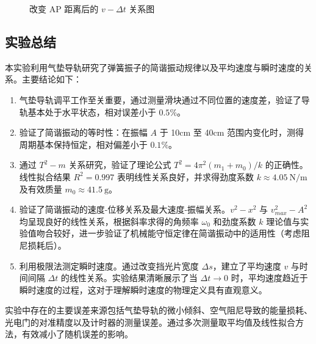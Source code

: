 \documentclass[11pt]{article}
\begin{document}
\begin{figure}[H]
    \centering
    \caption{改变 AP 距离后的 $v-\Delta t$ 关系图}
\end{figure}

\subsection{实验总结}
本实验利用气垫导轨研究了弹簧振子的简谐振动规律以及平均速度与瞬时速度的关系。主要结论如下：
\begin{enumerate}
    \item 气垫导轨调平工作至关重要，通过测量滑块通过不同位置的速度差，验证了导轨基本处于水平状态，相对误差小于 $0.5\%$。
    \item 验证了简谐振动的等时性：在振幅 $A$ 于 10cm 至 40cm 范围内变化时，测得周期基本保持恒定，相对偏差小于 $0.1\%$。
    \item 通过 $T^2-m$ 关系研究，验证了理论公式 $T^2 = 4\pi^2(m_1+m_0)/k$ 的正确性。线性拟合结果 $R^2=0.997$ 表明线性关系良好，并求得劲度系数 $k \approx 4.05\ \mathrm{N/m}$ 及有效质量 $m_0 \approx 41.5\ \mathrm{g}$。
    \item 验证了简谐振动的速度-位移关系及最大速度-振幅关系。$v^2-x^2$ 与 $v_{max}^2-A^2$ 均呈现良好的线性关系，根据斜率求得的角频率 $\omega_0$ 和劲度系数 $k$ 理论值与实验值吻合较好，进一步验证了机械能守恒定律在简谐振动中的适用性（考虑阻尼损耗后）。
    \item 利用极限法测定瞬时速度。通过改变挡光片宽度 $\Delta s$，建立了平均速度 $v$ 与时间间隔 $\Delta t$ 的线性关系。实验结果清晰展示了当 $\Delta t \to 0$ 时，平均速度趋近于瞬时速度的过程，这对于理解瞬时速度的物理定义具有直观意义。
\end{enumerate}

实验中存在的主要误差来源包括气垫导轨的微小倾斜、空气阻尼导致的能量损耗、光电门的对准精度以及计时器的测量误差。通过多次测量取平均值及线性拟合方法，有效减小了随机误差的影响。
\end{document}
